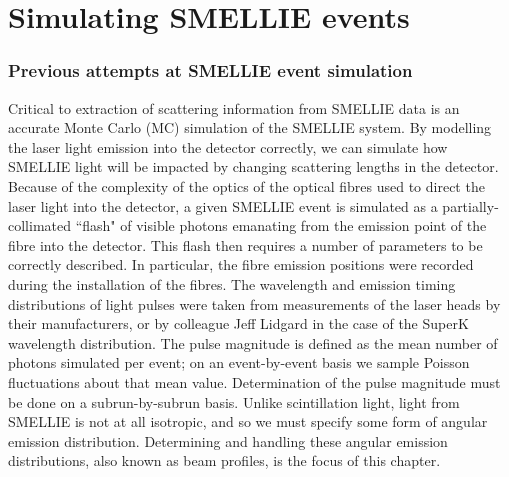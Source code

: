 \chapter{Simulating SMELLIE events}\label{sect:beam_profiling}
\subsection{Previous attempts at SMELLIE event simulation}
Critical to extraction of scattering information from SMELLIE data is an accurate Monte Carlo (MC) simulation of the SMELLIE system. By modelling the laser light emission into the detector correctly, we can simulate how SMELLIE light will be impacted by changing scattering lengths in the detector. Because of the complexity of the optics of the optical fibres used to direct the laser light into the detector, a given SMELLIE event is simulated as a partially-collimated ``flash" of visible photons emanating from the emission point of the fibre into the detector. This flash then requires a number of parameters to be correctly described. In particular, the fibre emission positions were recorded during the installation of the fibres. The wavelength and emission timing distributions of light pulses were taken from measurements of the laser heads by their manufacturers, or by colleague Jeff Lidgard in the case of the SuperK wavelength distribution. The pulse magnitude is defined as the mean number of photons simulated per event; on an event-by-event basis we sample Poisson fluctuations about that mean value. Determination of the pulse magnitude must be done on a subrun-by-subrun basis. Unlike scintillation light, light from SMELLIE is not at all isotropic, and so we must specify some form of angular emission distribution. Determining and handling these angular emission distributions, also known as beam profiles, is the focus of this chapter.

